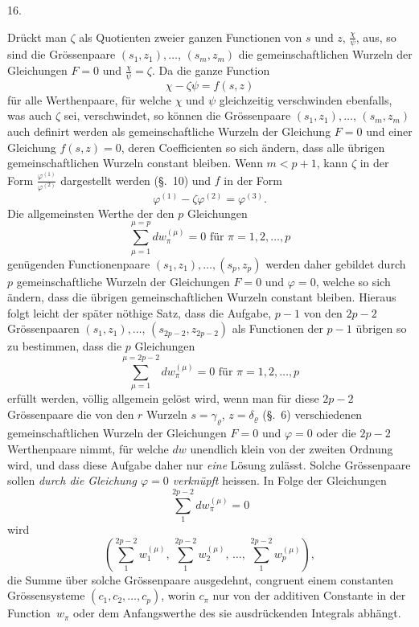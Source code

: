 \documentclass[a4paper,12pt,leqno]{article}
\begin{document}
\medbreak

\centerline{16.}

\nobreak\medskip

Dr\"{u}ckt man $\zeta$ als Quotienten zweier ganzen Functionen
von $s$ und $z$,
$\displaystyle \frac{\chi}{\psi}$,
aus, so sind die Gr\"{o}ssenpaare
$(s_1, z_1),\ldots$, $(s_m, z_m)$
die gemeinschaftlichen Wurzeln der Gleichungen $F = 0$ und
$\displaystyle \frac{\chi}{\psi} = \zeta$.
Da die ganze Function
\[ \chi - \zeta \psi = f(s,z) \]
f\"{u}r alle Werthenpaare, f\"{u}r welche $\chi$ und $\psi$
gleichzeitig verschwinden ebenfalls, was auch $\zeta$ sei,
verschwindet, so k\"{o}nnen die Gr\"{o}ssenpaare
$(s_1, z_1),\ldots$, $(s_m, z_m)$
auch definirt werden als gemeinschaftliche Wurzeln der Gleichung
$F = 0$ und einer Gleichung $f(s,z) = 0$, deren Coefficienten so
sich \"{a}ndern, dass alle \"{u}brigen gemeinschaftlichen Wurzeln
constant bleiben.  Wenn $m < p + 1$, kann $\zeta$ in der Form
$\displaystyle \frac{\varphi^{(1)}}{\varphi^{(2)}}$
dargestellt werden (\S.~10) und $f$ in der Form
\[ \varphi^{(1)} - \zeta \varphi^{(2)} = \varphi^{(3)}.\]
Die allgemeinsten Werthe der den $p$ Gleichungen
\[ \sum_{\mu = 1}^{\mu = p} dw_\pi^{(\mu)} = 0
   \mbox{ f\"{u}r } \pi = 1,2,\ldots, p \]
gen\"{u}genden Functionenpaare
$(s_1, z_1),\ldots, (s_p, z_p)$
werden daher gebildet durch $p$ gemeinschaftliche Wurzeln der
Gleichungen $F = 0$ und $\varphi = 0$, welche so sich \"{a}ndern,
dass die \"{u}brigen gemeinschaftlichen Wurzeln constant bleiben.
Hieraus folgt leicht der sp\"{a}ter n\"{o}thige Satz, dass die
Aufgabe, $p - 1$ von den $2p - 2$ Gr\"{o}ssenpaaren
$(s_1, z_1),\ldots$, $(s_{2p-2}, z_{2p-2})$ als Functionen der
$p - 1$ \"{u}brigen so zu bestimmen, dass die $p$ Gleichungen
\[ \sum_{\mu = 1}^{\mu = 2p - 2} dw_\pi^{(\mu)} = 0
   \mbox{ f\"{u}r } \pi = 1,2,\ldots, p \]
erf\"{u}llt werden, v\"{o}llig allgemein gel\"{o}st wird, wenn
man f\"{u}r diese $2p - 2$ Gr\"{o}ssenpaare die von den $r$
Wurzeln $s = \gamma_\varrho$, $z = \delta_\varrho$ (\S.~6)
verschiedenen gemeinschaftlichen Wurzeln der Gleichungen $F = 0$
und $\varphi = 0$ oder die $2p - 2$ Werthenpaare nimmt, f\"{u}r
welche $dw$ unendlich klein von der zweiten Ordnung wird, und
dass diese Aufgabe daher nur \emph{eine} L\"{o}sung zul\"{a}sst.
Solche Gr\"{o}ssenpaare sollen \emph{durch die Gleichung
$\varphi = 0$ verkn\"{u}pft} heissen.  In Folge der Gleichungen
\[ \sum_1^{2p - 2} dw_\pi^{(\mu)} = 0 \]
wird
\[ \left(
      \sum_1^{2p - 2} w_1^{(\mu)}, \,
      \sum_1^{2p - 2} w_2^{(\mu)}, \, \ldots, \,
      \sum_1^{2p - 2} w_p^{(\mu)}
   \right),\]
die Summe \"{u}ber solche Gr\"{o}ssenpaare ausgedehnt, congruent
einem constanten Gr\"{o}ssensysteme $(c_1, c_2,\ldots, c_p)$,
worin $c_\pi$ nur von der additiven Constante in der
Function~$w_\pi$ oder dem Anfangswerthe des sie ausdr\"{u}ckenden
Integrals abh\"{a}ngt.
\end{document}
